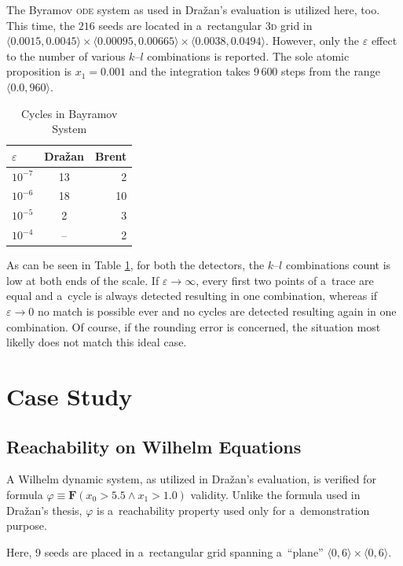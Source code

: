 \documentclass[12pt,twoside,draft]{fithesis}
\newcommand{\bF}{\mathbf{F}}
\begin{document}
The Byramov \textsc{ode} system as used in Dra\v{z}an's evaluation is
utilized here, too. This time, the $216$ seeds are located in
a~rectangular \textsc{3d} grid in
$\langle 0.0015,0.0045\rangle\times\langle 0.00095,0.00665
\rangle\times\langle 0.0038,0.0494\rangle$.
However, only the $\varepsilon$
effect to the number of various $k$--$l$ combinations is reported.
The sole atomic proposition is $x_1=0.001$ and the integration takes
9\,600 steps from the range $\langle 0.0,960\rangle$.
\begin{table}[h]
\label{tab:by}
\begin{tabular}{l | c r}
	$\varepsilon$ &Dra\v{z}an &Brent\\
	\hline
	$10^{-7}$ &13 &2\\
	$10^{-6}$ &18 &10\\
	$10^{-5}$ &2 &3\\
	$10^{-4}$ &-- &2\\
\end{tabular}
\caption{Cycles in Bayramov System}
\end{table}

As can be seen in Table \ref{tab:by}, for both the detectors,
the $k$--$l$ combinations count is low at both ends of the scale. If
$\varepsilon\rightarrow\infty$, every first two points of a~trace are
equal and a~cycle is always detected resulting in one combination,
whereas if $\varepsilon\rightarrow0$ no match is possible ever and no
cycles are detected resulting again in one combination. Of course, if
the rounding error is concerned, the situation most likelly does not
match this ideal case.

\section{Case Study}
\subsection*{Reachability on Wilhelm Equations}
A Wilhelm dynamic system, as utilized in Dra\v{z}an's
evaluation\cite{sven}, is verified for formula
$\varphi\equiv\bF(x_0>5.5\wedge x_1>1.0)$ validity. Unlike the formula
used in Dra\v{z}an's thesis, $\varphi$ is a~reachability property used
only for a~demonstration purpose.

Here, 9 seeds are placed in a~rectangular grid spanning a~``plane''
$\langle0,6\rangle\times\langle0,6\rangle$.
\end{document}
